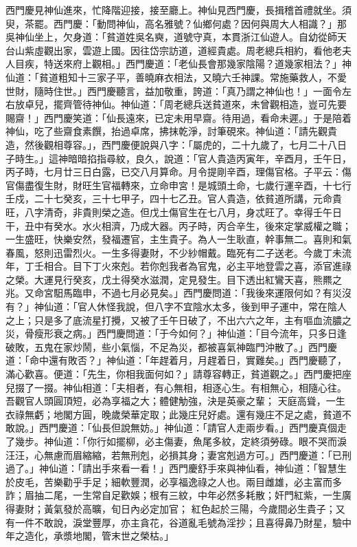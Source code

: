 西門慶見神仙進來，忙降階迎接，接至廳上。神仙見西門慶，長揖稽首禮就坐。須臾，茶罷。西門慶：「動問神仙，高名雅號？仙鄉何處？因何與周大人相識？」那吳神仙坐上，欠身道：「貧道姓吳名奭，道號守真，本貫浙江仙遊人。自幼從師天台山紫虛觀出家，雲遊上國。因往岱宗訪道，道經貴處。周老總兵相約，看他老夫人目疾，特送來府上觀相。」西門慶道：「老仙長會那幾家陰陽？道幾家相法？」神仙道：「貧道粗知十三家子平，善曉麻衣相法，又曉六壬神課。常施藥救人，不愛世財，隨時住世。」西門慶聽言，益加敬重，誇道：「真乃謂之神仙也！」一面令左右放卓兒，擺齊管待神仙。神仙道：「周老總兵送貧道來，未曾觀相造，豈可先要賜齋！」西門慶笑道：「仙長遠來，已定未用早齋。待用過，看命未遲。」于是陪着神仙，吃了些齋食素饌，抬過卓席，拂抹乾淨，討筆硯來。神仙道：「請先觀貴造，然後觀相尊容。」，西門慶便說與八字：「屬虎的，二十九歲了，七月二十八日子時生。」這神暗暗掐指尋紋，良久，說道：「官人貴造丙寅年，辛酉月，壬午日，丙子時，七月廿三日白露，已交八月算命。月令提剛辛酉，理傷官格。子平云：傷官傷盡復生財，財旺生官福轉來，立命申宮！是城頭土命，七歲行運辛酉，十七行壬戍，二十七癸亥，三十七甲子，四十七乙丑。官人貴造，依貧道所講，元命貴旺，八字清奇，非貴則榮之造。但戊土傷官生在七八月，身忒旺了。幸得壬午日干，丑中有癸水。水火相濟，乃成大器。丙子時，丙合辛生，後來定掌威權之職；一生盛旺，快樂安然，發福遷官，主生貴子。為人一生耿直，幹事無二。喜則和氣春風，怒則迅雷烈火。一生多得妻財，不少紗帽戴。臨死有二子送老。今歲丁未流年，丁壬相合。目下丁火來剋。若你剋我者為官鬼，必主平地登雲之喜，添官進祿之榮。大運見行癸亥，戊土得癸水滋潤，定見發生。目下透出紅鸞天喜，熊羆之兆。又命宮馹馬臨申，不過七月必見矣。」西門慶問道：「我後來運限何如？有災沒有？」神仙道：「官人休怪我說，但八字不宜陰水太多，後到甲子運中，常在陰人之上；只是多了底流星打攪，又被了壬午日破了，不出六六之年，主有嘔血流膿之災，骨瘦形衰之病。」西門慶問道：「于今如何？」神仙道：「目今流年，只多日逢破敗，五鬼在家炒鬧，些小氣惱，不足為災，都被喜氣神臨門沖散了。」西門慶道：「命中還有敗否？」神仙道：「年趕着月，月趕着日，實難矣。」西門慶聽了，滿心歡喜。便道：「先生，你相我面何如？」請尊容轉正，貧道觀之。」西門慶把座兒掇了一掇。神仙相道：「夫相者，有心無相，相逐心生。有相無心，相隨心往。吾觀官人頭圓頂短，必為享福之大；體健觔強，決是英豪之輩； 天庭高聳，一生衣祿無虧；地閣方圓，晚歲榮華定取；此幾庄兒好處。還有幾庄不足之處，貧道不敢說。」西門慶道：「仙長但說無妨。」神仙道：「請官人走兩步看。」西門慶真個走了幾步。神仙道：「你行如擺柳，必主傷妻，魚尾多紋，定終須勞碌。眼不哭而淚汪汪，心無慮而眉縮縮，若無刑剋，必損其身；妻宮剋過方可。」西門慶道：「已刑過了。」神仙道：「請出手來看一看！」西門慶舒手來與神仙看，神仙道：「智慧生於皮毛，苦樂勸乎手足；細軟豐潤，必享福逸祿之人也。兩目雌雄，必主富而多詐；眉抽二尾，一生常自足歡娛；根有三紋，中年必然多耗散；奸門紅紫，一生廣得妻財；黃氣發於高曠，旬日內必定加官； 紅色起於三陽，今歲間必生貴子；又有一件不敢說，淚堂豐厚，亦主貪花，谷道亂毛號為淫抄；且喜得鼻乃財星，驗中年之造化，承漿地閣，管末世之榮枯。」

